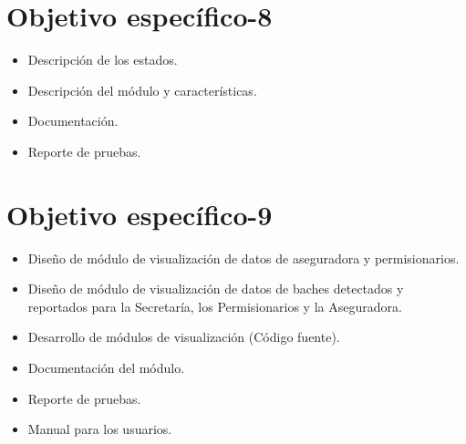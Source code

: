 \section{Objetivo específico-8}
\begin{itemize}
    \item Descripción de los estados.
    \item Descripción del módulo y características. 
    \item Documentación.
    \item Reporte de pruebas.
\end{itemize}

\section{Objetivo específico-9}
\begin{itemize}
    \item Diseño de módulo de visualización de datos de aseguradora y permisionarios.
    \item Diseño de módulo de visualización de datos de baches detectados y reportados para la Secretaría, los Permisionarios y la Aseguradora.
    \item Desarrollo de módulos de visualización (Código fuente). 
    \item Documentación del módulo.
    \item Reporte de pruebas.
    \item Manual para los usuarios.    
\end{itemize}